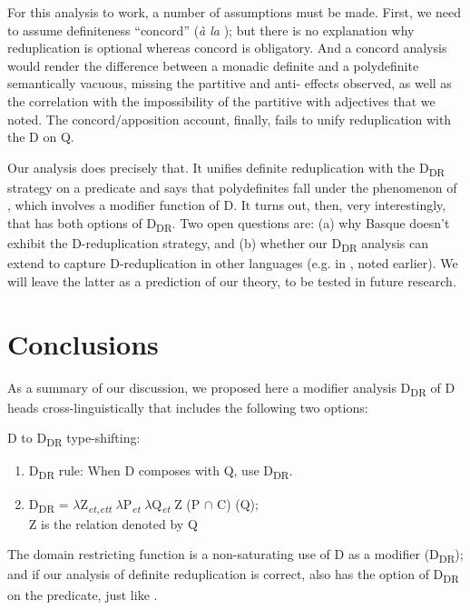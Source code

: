 \documentclass[output=paper,
modfonts
]{langscibook}
\begin{document}
For this analysis to work, a number of assumptions must be made. First, we need to assume definiteness ``concord'' (\textit{\`a la} \citealt{zeijlstra2004}); but there is no explanation why reduplication is optional whereas concord is obligatory. And a concord analysis would render the difference between a monadic definite and a polydefinite semantically vacuous, missing the partitive and anti- effects observed, as well as the correlation with the impossibility of the partitive with adjectives that we noted. The concord/apposition account, finally, fails to unify reduplication with the D on Q. 

Our analysis does precisely that. It unifies definite reduplication with the D\textsubscript{DR} strategy on a predicate and says that polydefinites fall under the phenomenon of , which involves a modifier function of D.  It turns out, then, very interestingly, that  has both options of D\textsubscript{DR}. Two open questions are: (a) why Basque doesn't exhibit the D-reduplication strategy, and (b) whether our D\textsubscript{DR} analysis can extend to capture D-reduplication in other languages (e.g. in , noted earlier). We will leave the latter as a prediction of our theory, to be tested in future research. 


\section{Conclusions}

As a summary of our discussion, we proposed here a modifier analysis D\textsubscript{DR} of D heads cross-linguistically that includes the following two options:

\ea
	D to D\textsubscript{DR} type-shifting:
	\begin{enumerate}
		\item D\textsubscript{DR} rule: When D composes with Q, use D\textsubscript{DR}.
		\item D\textsubscript{DR} = $\lambda$Z\textsubscript{\textit{et,ett}} $\lambda$P\textsubscript{\textit{et}} $\lambda$Q\textsubscript{\textit{et}} Z (P $\cap$ C) (Q);\\ Z is the relation denoted by Q
	\end{enumerate}
\z

The domain restricting function is a non-saturating use of D as a modifier (D\textsubscript{DR}); and if our analysis of  definite reduplication is correct,  also has the option of D\textsubscript{DR} on the predicate, just like . 
\end{document}
